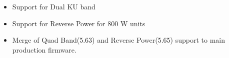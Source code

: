 \documentclass[letterpaper,10pt,english]{sphinxhowto}
\begin{document}
\begin{description}
\begin{itemize}
\item {} 
\sphinxAtStartPar
Support for Dual KU band

\end{itemize}

\begin{itemize}
\item {} 
\sphinxAtStartPar
Support for Reverse Power for 800 W units

\end{itemize}

\begin{itemize}
\item {} 
\sphinxAtStartPar
Merge of Quad Band(5.63) and Reverse Power(5.65) support to main production firmware.

\end{itemize}

\end{description}



\renewcommand{\indexname}{Index}
\printindex
\end{document}
